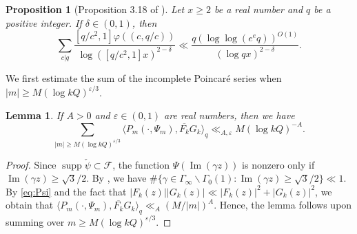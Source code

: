 \documentclass[12pt,reqno]{amsart}
\newtheorem{lem}[thm]{Lemma}
\newtheorem{prop}[thm]{Proposition}
\theoremstyle{remark}
\newcommand{\bs}{\backslash}
\DeclareMathOperator{\Imag}{Im}
\DeclareMathOperator{\supp}{supp}
\numberwithin{equation}{section}
\begin{document}
	\begin{prop}[Proposition 3.18 of \cite{NPS}]\label{prop:shiftedcon2}
		Let $x \ge 2$ be a real number and $q$ be a positive integer. If $\delta \in (0,1)$, then 
		\[
		\sum_{c|q} \frac{[q/c^2,1]\varphi((c,q/c))}{\log([q/c^2,1]x)^{2-\delta }}\ll \frac{q (\log\log(e^eq))^{O(1)}}{(\log qx)^{2-\delta }}.
		\]
	\end{prop}
	
	We first estimate the sum of the incomplete Poincar\'e series when $|m| \ge M(\log kQ)^{\varepsilon/3}$.
	
	\begin{lem}\label{lem:H_cor_tail} 
    If $A > 0$ and $\varepsilon \in (0,1)$ are real numbers, then we have
		\[
			\sum_{|m| \ge M(\log kQ)^{\varepsilon/3}} \langle  P_m(\cdot, \Psi_m), \overline{F_k}G_k \rangle_q \ll_{A,\varepsilon} M(\log kQ)^{-A}.
		\]
	\end{lem}
	\begin{proof}
        Since $\supp \check{\psi} \subset \mathcal{F}$, the function $\Psi(\Imag(\gamma z))$ is nonzero only if $\Imag(\gamma z) \ge \sqrt{3}/2$. By  \cite[Lemma 2.10]{Iw}, we have $\#\{\gamma \in \Gamma_\infty\bs\Gamma_0(1): \Imag(\gamma z) \ge \sqrt{3}/2\} \ll 1$.
        By \eqref{eq:Psi} and the fact that $|F_k(z)||G_k(z)| \ll |F_k(z)|^2+ |G_k(z)|^2$, we obtain that $\langle P_m(\cdot, \Psi_m), \overline{F_k}G_k \rangle_q \ll_A (M/|m|)^A.$
        Hence, the lemma follows upon summing over $m \ge M(\log kQ)^{\varepsilon/3}$.
 \end{proof}
 
\end{document}
